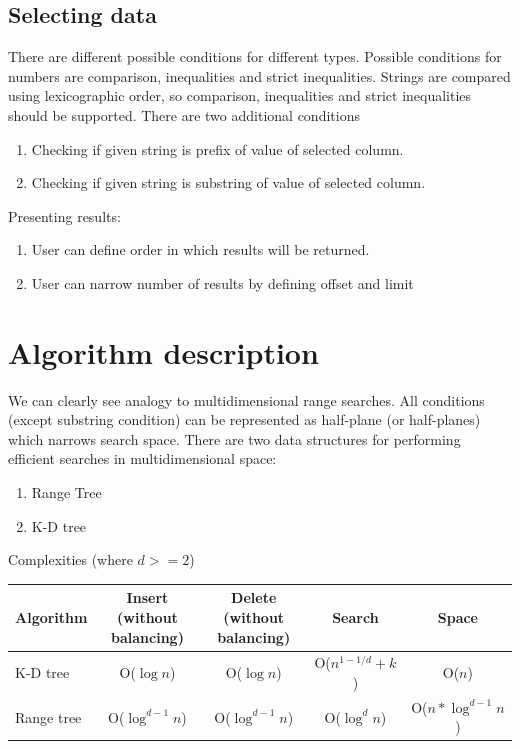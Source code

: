 \documentclass{llncs}
\newcommand{\<}{\langle}
\renewcommand{\>}{\rangle}
\begin{document}
\subsection{Selecting data}
There are different possible conditions for different types. Possible conditions for numbers are comparison, inequalities and strict inequalities. Strings are compared using lexicographic order, so comparison, inequalities and strict inequalities should be supported. There are two additional conditions
\begin{enumerate}
\item Checking if given string is prefix of value of selected column. 
\item Checking if given string is substring of value of selected column. 
\end{enumerate}
Presenting results:
\begin{enumerate}
\item User can define order in which results will be returned.
\item User can narrow number of results by defining offset and limit
\end{enumerate}

\section{Algorithm description}
We can clearly see analogy to multidimensional range searches. All conditions (except substring condition) can be represented as half-plane (or half-planes) which narrows search space. There are two data structures for performing efficient searches in multidimensional space:

\begin{enumerate}
\item Range Tree \cite{CGAAA}
\item K-D tree \cite{CGAAA}
\end{enumerate}

Complexities (where $d>=2$)

\begin{tabular}{|l|c|c|c|c|}
\hline Algorithm & Insert (without balancing) & Delete (without balancing) & Search & Space \\
\hline K-D tree & O($\log{n}$) & O($\log{n}$) & O($n^{1-1/d} + k$) & O($n$) \\
\hline Range tree & O($\log^{d-1}{n}$) & O($\log^{d-1}{n}$) & O($\log^d{n}$) & O($n*\log^{d-1}{n}$) \\
\hline 
\end{tabular}
\end{document}
